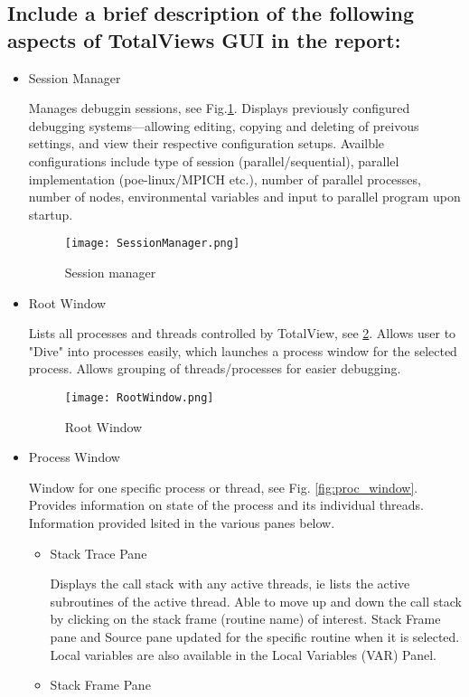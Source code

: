 \documentclass{article}
\begin{document}
\subsection{Include a brief description of the following aspects of TotalViews GUI in the report:}
\begin{itemize}
	\item Session Manager
	
	Manages debuggin sessions, see Fig.\ref{fig:sess_manager}. Displays previously configured debugging systems---allowing editing, copying and deleting of preivous settings, and view their respective configuration setups. Availble configurations include type of session (parallel/sequential), parallel implementation (poe-linux/MPICH etc.), number of parallel processes, number of nodes, environmental variables and input to parallel program upon startup.
	\begin{figure}[p] %
			\texttt{[image: SessionManager.png]}
		\caption{Session manager}
		\label{fig:sess_manager}
	\end{figure}
	\item Root Window
	
	Lists all processes and threads controlled by TotalView, see \ref{fig:root_window}. Allows user to "Dive" into processes easily, which launches a process window for the selected process. Allows grouping of threads/processes for easier debugging.
		\begin{figure}[p] %
			\texttt{[image: RootWindow.png]}
		\caption{Root Window}
		\label{fig:root_window}
	\end{figure}
	\item Process Window
	
	Window for one specific process or thread, see Fig. \ref{fig:proc_window}. Provides information on state of the process and its individual threads. Information provided lsited in the various panes below.
	\begin{itemize}
		\item Stack Trace Pane
		
		Displays the call stack with any active threads, ie lists the active subroutines of the active thread. Able to move up and down the call stack by clicking on the stack frame (routine name) of interest. Stack Frame pane and Source pane updated for the specific routine when it is selected. Local variables are also available in the Local Variables (VAR) Panel.
		\item Stack Frame Pane
		

\end{itemize}
\end{itemize}
\end{document}
